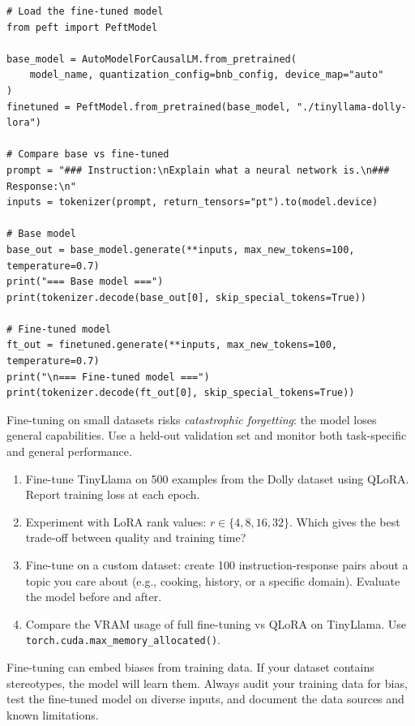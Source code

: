 \begin{verbatim}
# Load the fine-tuned model
from peft import PeftModel

base_model = AutoModelForCausalLM.from_pretrained(
    model_name, quantization_config=bnb_config, device_map="auto"
)
finetuned = PeftModel.from_pretrained(base_model, "./tinyllama-dolly-lora")

# Compare base vs fine-tuned
prompt = "### Instruction:\nExplain what a neural network is.\n### Response:\n"
inputs = tokenizer(prompt, return_tensors="pt").to(model.device)

# Base model
base_out = base_model.generate(**inputs, max_new_tokens=100, temperature=0.7)
print("=== Base model ===")
print(tokenizer.decode(base_out[0], skip_special_tokens=True))

# Fine-tuned model
ft_out = finetuned.generate(**inputs, max_new_tokens=100, temperature=0.7)
print("\n=== Fine-tuned model ===")
print(tokenizer.decode(ft_out[0], skip_special_tokens=True))
\end{verbatim}

\begin{warningbox}
Fine-tuning on small datasets risks \emph{catastrophic forgetting}: the model loses general capabilities. Use a held-out validation set and monitor both task-specific and general performance.
\end{warningbox}

\begin{exercise}
\begin{enumerate}
  \item Fine-tune TinyLlama on 500 examples from the Dolly dataset using QLoRA. Report training loss at each epoch.
  \item Experiment with LoRA rank values: $r \in \{4, 8, 16, 32\}$. Which gives the best trade-off between quality and training time?
  \item Fine-tune on a custom dataset: create 100 instruction-response pairs about a topic you care about (e.g., cooking, history, or a specific domain). Evaluate the model before and after.
  \item Compare the VRAM usage of full fine-tuning vs QLoRA on TinyLlama. Use \texttt{torch.cuda.max\_memory\_allocated()}.
\end{enumerate}
\end{exercise}

\begin{ethicsbox}
Fine-tuning can embed biases from training data. If your dataset contains stereotypes, the model will learn them. Always audit your training data for bias, test the fine-tuned model on diverse inputs, and document the data sources and known limitations.
\end{ethicsbox}

